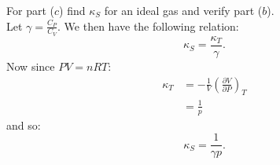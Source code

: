 \begin{enumerate}
    For part ($c$) find $\kappa_S$ for an ideal gas
    and verify part ($b$). \\

    Let $\gamma=\displaystyle\frac{C_P}{C_V}$.
    We then have the following relation:
    $$\kappa_S=\frac{\kappa_T}{\gamma}.$$
    Now since $PV=nRT$:
    \begin{align*}
        \kappa_T
        &=-\frac{1}{V}
        \left(\frac{\partial V}{\partial P}\right)_T \\
        &=\frac{1}{p}
    \end{align*}
    and so:
    $$\kappa_S=\frac{1}{\gamma p}.$$

\end{enumerate}